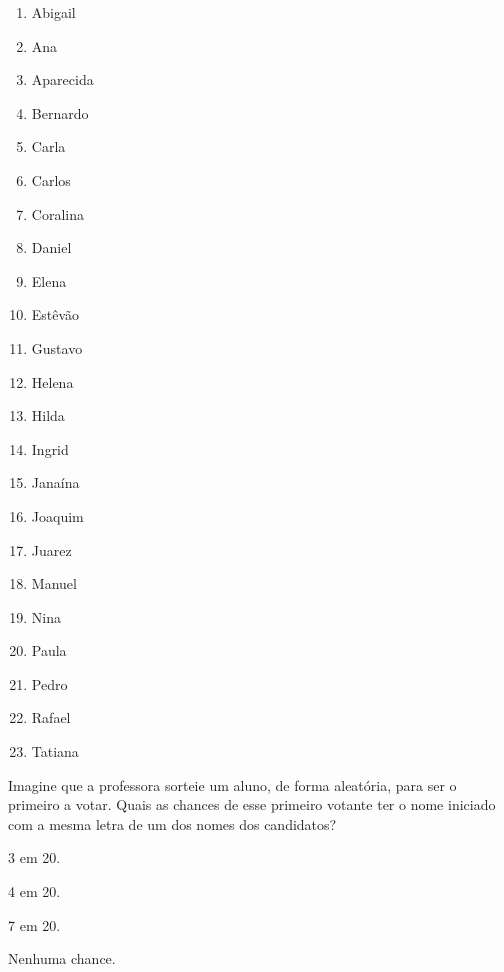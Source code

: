 \begin{myquote}
\begin{multicols}{3}
\begin{enumerate}
\item [] Abigail

\item [] Ana

\item [] Aparecida

\item [] Bernardo

\item [] Carla

\item [] Carlos

\item [] Coralina

\item [] Daniel 

\item [] Elena

\item [] Estêvão

\item [] Gustavo

\item [] Helena

\item [] Hilda

\item [] Ingrid

\item [] Janaína

\item [] Joaquim

\item [] Juarez

\item [] Manuel

\item [] Nina

\item [] Paula

\item [] Pedro

\item [] Rafael

\item [] Tatiana
\end{enumerate}
\end{multicols}
\end{myquote}

Imagine que a professora sorteie um aluno, de forma aleatória, para ser o primeiro a votar. Quais as chances de esse primeiro votante ter o nome iniciado com a mesma letra de um dos nomes dos candidatos?

\begin{escolha}
\begin{multicols}{2}
\item
3 em 20.
\item
4 em 20.
\item
7 em 20.
\item
Nenhuma chance.
\end{multicols}
\end{escolha}

